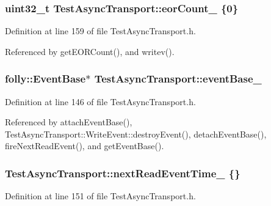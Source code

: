 \subsubsection[{eor\+Count\+\_\+}]{\setlength{\rightskip}{0pt plus 5cm}uint32\+\_\+t Test\+Async\+Transport\+::eor\+Count\+\_\+ \{0\}\hspace{0.3cm}{\ttfamily [private]}}\label{classTestAsyncTransport_a55b74950fe2aa4fc9ee68cd32b9c3b43}


Definition at line 159 of file Test\+Async\+Transport.\+h.



Referenced by get\+E\+O\+R\+Count(), and writev().

\subsubsection[{event\+Base\+\_\+}]{\setlength{\rightskip}{0pt plus 5cm}folly\+::\+Event\+Base$\ast$ Test\+Async\+Transport\+::event\+Base\+\_\+\hspace{0.3cm}{\ttfamily [private]}}\label{classTestAsyncTransport_ae04c4b0d1b7c498c579ae4f8d822c7cd}


Definition at line 146 of file Test\+Async\+Transport.\+h.



Referenced by attach\+Event\+Base(), Test\+Async\+Transport\+::\+Write\+Event\+::destroy\+Event(), detach\+Event\+Base(), fire\+Next\+Read\+Event(), and get\+Event\+Base().

\subsubsection[{next\+Read\+Event\+Time\+\_\+}]{ Test\+Async\+Transport\+::next\+Read\+Event\+Time\+\_\+ \{\}\hspace{0.3cm}{\ttfamily [private]}}\label{classTestAsyncTransport_a5ade01589e08071a3425c6d5391a954d}


Definition at line 151 of file Test\+Async\+Transport.\+h.



